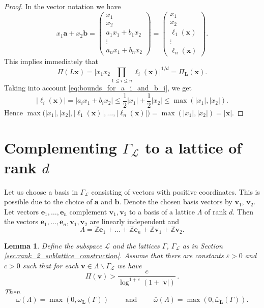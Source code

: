 \documentclass[a4paper,12pt]{article}
\theoremstyle{definition}
\theoremstyle{remark}
\theoremstyle{plain}
\newtheorem{lemma}{Lemma}
\renewcommand{\vec}[1]{\mathbf{#1}}
\renewcommand{\leq}{\leqslant}
\newcommand{\e}{\varepsilon}
\newcommand{\Z}{\mathbb{Z}}
\newcommand{\La}{\Lambda}
\newcommand{\Ga}{\Gamma}
\newcommand{\cL}{\mathcal{L}}
\newcommand{\bL}{\mathbf{L}}
\begin{document}
\begin{proof}
  In the vector notation we have
  \[
    x_1\vec a+x_2\vec b=
    \begin{pmatrix}
      x_1 \\
      x_2 \\
      a_1x_1+b_1x_2 \\
      \vdots \\
      a_nx_1+b_nx_2
    \end{pmatrix}=
    \begin{pmatrix}
      x_1 \\
      x_2 \\
      \ell_1(\vec x) \\
      \vdots \\
      \ell_n(\vec x)
    \end{pmatrix}.
  \]
  This implies immediately that
  \[
    \Pi(L\vec x)=
    \bigg|x_1x_2\prod_{1\leq i\leq n}\ell_i(\vec x)\bigg|^{1/d}=
    \Pi_\bL(\vec x).
  \]
  Taking into account \eqref{eq:bounds_for_a_i_and_b_i}, we get
  \[
    |\ell_i(\vec x)|=
    |a_ix_1+b_ix_2|\leq
    \frac12|x_1|+\frac12|x_2|\leq
    \max(|x_1|,|x_2|).
  \]
  Hence $\max\big(|x_1|,|x_2|,|\ell_1(\vec x)|,\ldots,|\ell_n(\vec x)|\big)=\max(|x_1|,|x_2|)=|\vec x|$.
\end{proof}


\section{Complementing $\Ga_\cL$ to a lattice of rank $d$}\label{sec:complement_to_La}


Let us choose a basis in $\Ga_\cL$ consisting of vectors with positive coordinates. This is possible due to the choice of $\vec a$ and $\vec b$. Denote the chosen basis vectors by $\vec v_1$, $\vec v_2$. Let vectors $\vec e_1,\ldots,\vec e_n$ complement $\vec v_1,\vec v_2$ to a basis of a lattice $\La$ of rank $d$. Then the vectors $\vec e_1,\ldots,\vec e_n,\vec v_1,\vec v_2$ are linearly independent and
\[
  \La=\Z\vec e_1+\ldots+\Z\vec e_n+\Z\vec v_1+\Z\vec v_2.
\]

\begin{lemma}\label{l:2dim_provides_all}
  Define the subspace $\cL$ and the lattices $\Ga$, $\Ga_\cL$ as in Section \ref{sec:rank_2_sublattice_construction}. Assume that there are constants $\e>0$ and $c>0$ such that for each $\vec v\in\La\backslash\Ga_\cL$ we have
  \begin{equation}\label{eq:2dim_provides_all_condition}
    \Pi(\vec v)>\frac c{\log^{1+\e}(1+|\vec v|)}\,.
  \end{equation}
  Then
  \[
    \omega(\La)=\max(0,\omega_\bL(\Ga))
    \qquad\text{ and }\qquad
    \bar\omega(\La)=\max(0,\bar\omega_\bL(\Ga)).
  \]
\end{lemma}
\end{document}
